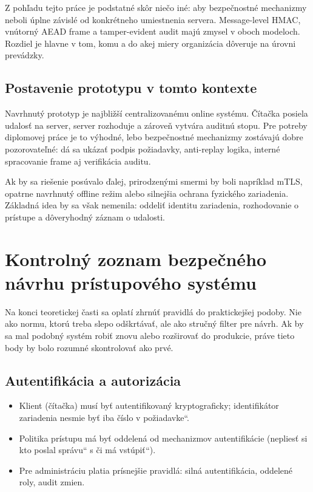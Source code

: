 \documentclass[journal,a4paper,onecolumn]{IEEEtran}
\newcommand{\uv}[1]{\quotedblbase#1\textquotedblleft}
\begin{document}
Z pohľadu tejto práce je podstatné skôr niečo iné: aby bezpečnostné mechanizmy neboli úplne závislé od konkrétneho umiestnenia servera. Message-level HMAC, vnútorný AEAD frame a tamper-evident audit majú zmysel v oboch modeloch. Rozdiel je hlavne v tom, komu a do akej miery organizácia dôveruje na úrovni prevádzky.
\subsection{Postavenie prototypu v tomto kontexte}

Navrhnutý prototyp je najbližší centralizovanému online systému. Čítačka posiela udalosť na server, server rozhoduje a zároveň vytvára auditnú stopu. Pre potreby diplomovej práce je to výhodné, lebo bezpečnostné mechanizmy zostávajú dobre pozorovateľné: dá sa ukázať podpis požiadavky, anti-replay logika, interné spracovanie frame aj verifikácia auditu.

Ak by sa riešenie posúvalo ďalej, prirodzenými smermi by boli napríklad mTLS, opatrne navrhnutý offline režim alebo silnejšia ochrana fyzického zariadenia. Základná idea by sa však nemenila: oddeliť identitu zariadenia, rozhodovanie o prístupe a dôveryhodný záznam o udalosti.


\section{Kontrolný zoznam bezpečného návrhu prístupového systému}

Na konci teoretickej časti sa oplatí zhrnúť pravidlá do praktickejšej podoby. Nie ako normu, ktorú treba slepo odškrtávať, ale ako stručný filter pre návrh. Ak by sa mal podobný systém robiť znovu alebo rozširovať do produkcie, práve tieto body by bolo rozumné skontrolovať ako prvé.

\subsection{Autentifikácia a autorizácia}

\begin{itemize}[leftmargin=*,itemsep=2pt]
  \item Klient (čítačka) musí byť autentifikovaný kryptograficky; identifikátor zariadenia nesmie byť iba \uv{číslo v požiadavke}.
  \item Politika prístupu má byť oddelená od mechanizmov autentifikácie (nepliesť si \uv{kto poslal správu} s \uv{či má vstúpiť}).
  \item Pre administráciu platia prísnejšie pravidlá: silná autentifikácia, oddelené roly, audit zmien.
\end{itemize}
\end{document}
